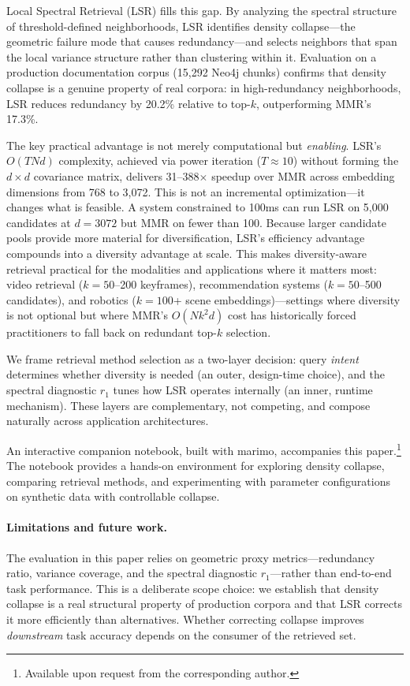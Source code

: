\documentclass{article}
\begin{document}
Local Spectral Retrieval (LSR) fills this gap. By analyzing the spectral structure of threshold-defined neighborhoods, LSR identifies density collapse---the geometric failure mode that causes redundancy---and selects neighbors that span the local variance structure rather than clustering within it. Evaluation on a production documentation corpus (15,292 Neo4j chunks) confirms that density collapse is a genuine property of real corpora: in high-redundancy neighborhoods, LSR reduces redundancy by 20.2\% relative to top-$k$, outperforming MMR's 17.3\%.

The key practical advantage is not merely computational but \emph{enabling}. LSR's $O(TNd)$ complexity, achieved via power iteration ($T \approx 10$) without forming the $d \times d$ covariance matrix, delivers 31--388$\times$ speedup over MMR across embedding dimensions from 768 to 3,072. This is not an incremental optimization---it changes what is feasible. A system constrained to 100ms can run LSR on 5,000 candidates at $d\!=\!3072$ but MMR on fewer than 100. Because larger candidate pools provide more material for diversification, LSR's efficiency advantage compounds into a diversity advantage at scale. This makes diversity-aware retrieval practical for the modalities and applications where it matters most: video retrieval ($k\!=\!50$--200 keyframes), recommendation systems ($k\!=\!50$--500 candidates), and robotics ($k\!=\!100$+ scene embeddings)---settings where diversity is not optional but where MMR's $O(Nk^2d)$ cost has historically forced practitioners to fall back on redundant top-$k$ selection.

We frame retrieval method selection as a two-layer decision: query \emph{intent} determines whether diversity is needed (an outer, design-time choice), and the spectral diagnostic $r_1$ tunes how LSR operates internally (an inner, runtime mechanism). These layers are complementary, not competing, and compose naturally across application architectures.

An interactive companion notebook, built with marimo, accompanies this paper.\footnote{Available upon request from the corresponding author.} The notebook provides a hands-on environment for exploring density collapse, comparing retrieval methods, and experimenting with parameter configurations on synthetic data with controllable collapse.

\paragraph{Limitations and future work.}
The evaluation in this paper relies on geometric proxy metrics---redundancy ratio, variance coverage, and the spectral diagnostic $r_1$---rather than end-to-end task performance. This is a deliberate scope choice: we establish that density collapse is a real structural property of production corpora and that LSR corrects it more efficiently than alternatives. Whether correcting collapse improves \emph{downstream} task accuracy depends on the consumer of the retrieved set.
\end{document}
